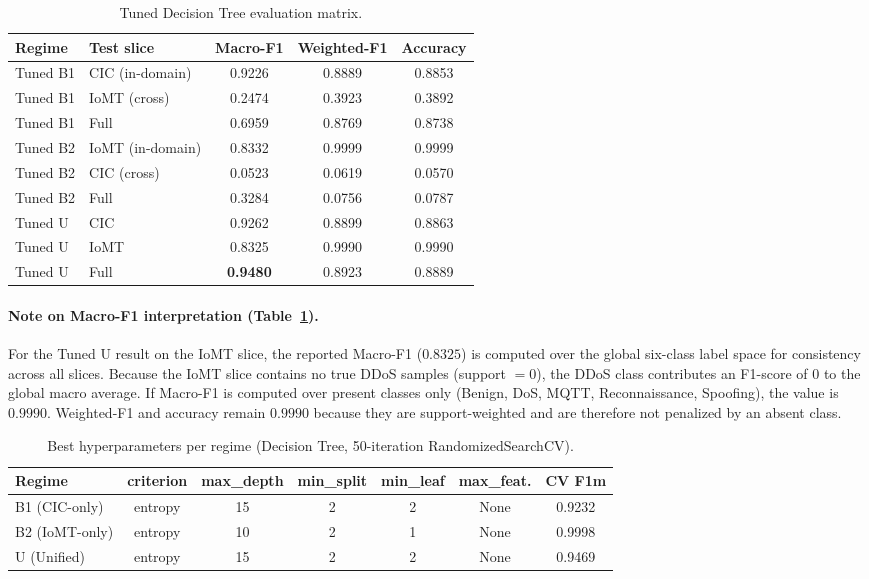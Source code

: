 \begin{table}[H]
\centering
\caption{Tuned Decision Tree evaluation matrix.}
\label{tab:dt-tuned}
\small
\begin{tabular}{@{}l l c c c@{}}
\toprule
\textbf{Regime} & \textbf{Test slice} & \textbf{Macro-F1} & \textbf{Weighted-F1} & \textbf{Accuracy} \\
\midrule
Tuned B1 & CIC (in-domain)  & 0.9226 & 0.8889 & 0.8853 \\
Tuned B1 & IoMT (cross)     & 0.2474 & 0.3923 & 0.3892 \\
Tuned B1 & Full             & 0.6959 & 0.8769 & 0.8738 \\
\midrule
Tuned B2 & IoMT (in-domain) & 0.8332 & 0.9999 & 0.9999 \\
Tuned B2 & CIC (cross)      & 0.0523 & 0.0619 & 0.0570 \\
Tuned B2 & Full             & 0.3284 & 0.0756 & 0.0787 \\
\midrule
Tuned U  & CIC              & 0.9262 & 0.8899 & 0.8863 \\
Tuned U  & IoMT             & 0.8325 & 0.9990 & 0.9990 \\
Tuned U  & Full             & \textbf{0.9480} & 0.8923 & 0.8889 \\
\bottomrule
\end{tabular}
\end{table}
\FloatBarrier

\paragraph{Note on Macro-F1 interpretation (Table~\ref{tab:dt-tuned}).}
For the Tuned U result on the IoMT slice, the reported Macro-F1 ($0.8325$) is computed over the global six-class label space for consistency across all slices. Because the IoMT slice contains no true DDoS samples (support $=0$), the DDoS class contributes an F1-score of $0$ to the global macro average. If Macro-F1 is computed over present classes only (Benign, DoS, MQTT, Reconnaissance, Spoofing), the value is $0.9990$. Weighted-F1 and accuracy remain $0.9990$ because they are support-weighted and are therefore not penalized by an absent class.

\begin{table}[H]
\centering
\caption{Best hyperparameters per regime (Decision Tree, 50-iteration RandomizedSearchCV).}
\label{tab:dt-best-params}
\small
\begin{tabular}{@{}l c c c c c c@{}}
\toprule
\textbf{Regime} & \textbf{criterion} & \textbf{max\_depth} & \textbf{min\_split} & \textbf{min\_leaf} & \textbf{max\_feat.} & \textbf{CV F1m} \\
\midrule
B1 (CIC-only)  & entropy & 15   & 2 & 2 & None & 0.9232 \\
B2 (IoMT-only) & entropy & 10   & 2 & 1 & None & 0.9998 \\
U (Unified)    & entropy & 15   & 2 & 2 & None & 0.9469 \\
\bottomrule
\end{tabular}
\end{table}

